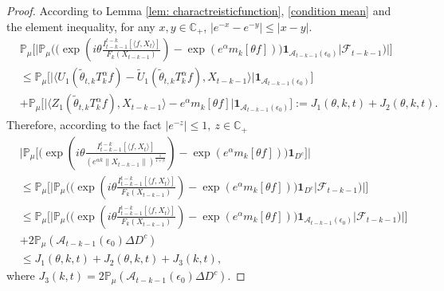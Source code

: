 \documentclass[12pt,oneside,english]{amsart}
\theoremstyle{plain}
\theoremstyle{definition}
\numberwithin{equation}{section}
\begin{document}
\begin{proof}
      According to Lemma \ref{lem: charactreisticfunction}, \eqref{condition mean} and the element inequality, for any $x,y\in \mathbb{C}_{+}$, $|e^{-x}-e^{-y}|\leq |x-y|$.
    \begin{align}
        &\mathbb{P}_{\mu}\Big[\Big|\mathbb{P}_{\mu}\Big(\big(\exp(i\theta \frac {I_{t-k-1}^{t-k}[\langle f ,X_t\rangle]}{F_k(X_{t-k-1})})-\exp(e^{\alpha}m_k[\theta f])\big)\mathbf{1}_{\mathcal{A}_{t-k-1}(\epsilon_0)}\Big|\mathscr{F}_{t-k-1}\Big)\Big|\Big]\\
        &\leq \mathbb{P}_{\mu}\big[\big|\langle U_1(\tilde{\theta}_{t,k}T_k^{\alpha}f)-\tilde{U}_1(\tilde{\theta}_{t,k}T_k^{\alpha}f), X_{t-k-1}\rangle\big|\mathbf{1}_{\mathcal{A}_{t-k-1}(\epsilon_0)}\big]\\
        \label{ineqinlem31}
        &+\mathbb{P}_{\mu}\big[\big|\langle Z_1(\tilde{\theta}_{t,k}T_k^{\alpha}f),X_{t-k-1}\rangle-e^{\alpha}m_k[\theta f]\big|\mathbf{1}_{\mathcal{A}_{t-k-1}(\epsilon_0)}\big]:=J_1(\theta,k,t)+J_2(\theta,k,t).
    \end{align}
Therefore, according to the fact $|e^{-z}|\leq1,~z\in \mathbb{C}_+$
\begin{align}
    &\Big|\mathbb{P}_{\mu}\Big[\big(\exp(i\theta \frac {I_{t-k-1}^{t-k}[\langle f ,X_t\rangle]}{(e^{\alpha k}\|X_{t-k-1}\|)^{\frac{1}{1+\beta}}})-\exp(e^{\alpha}m_k[\theta f])\big)\mathbf{1}_{D^c}\Big]\Big|
    \\& \leq \mathbb{P}_{\mu}\Big[\Big|\mathbb{P}_{\mu}\Big(\big(\exp(i\theta \frac {I_{t-k-1}^{t-k}[\langle f ,X_t\rangle]}{F_k(X_{t-k-1})})-\exp(e^{\alpha}m_k[\theta f])\big)\mathbf{1}_{D^c}\Big|\mathscr{F}_{t-k-1}\Big)\Big|\Big]
    \label{ineq: used in next corollary}
    \\ & \leq\mathbb{P}_{\mu}\Big[\Big|\mathbb{P}_{\mu}\Big(\big(\exp(i\theta \frac {I_{t-k-1}^{t-k}[\langle f ,X_t\rangle]}{F_k(X_{t-k-1})})-\exp(e^{\alpha}m_k[\theta f])\big)\mathbf{1}_{\mathcal{A}_{t-k-1}(\epsilon_0)}\Big|\mathscr{F}_{t-k-1}\Big)\Big|\Big]
    \\&+ 2\mathbb{P}_{\mu}(\mathcal{A}_{t-k-1}(\epsilon_0)\Delta D^c)\\
    &\leq J_1(\theta,k,t)+J_2(\theta,k,t)+J_3(k,t),
\end{align}
where $J_3(k,t)=2\mathbb{P}_{\mu}(\mathcal{A}_{t-k-1}(\epsilon_0)\Delta D^c)$.


\end{proof}
\end{document}
